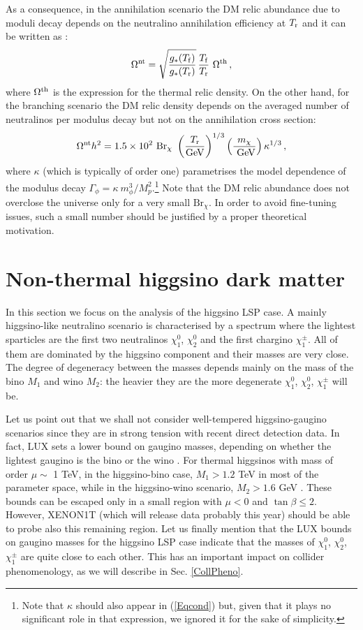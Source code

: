 \documentclass[11pt,a4paper]{article}
\newcommand{\be}{\begin{equation}}
\newcommand{\ee}{\end{equation}}
\begin{document}
As a consequence, in the annihilation scenario the DM relic abundance due to moduli decay depends on the neutralino annihilation efficiency at $T_{\rm r}$ and it can be written as \cite{Gelmini:2006pw}:
\be
\Omega^{\rm nt} =\sqrt{\frac{g_*(T_{\rm f})} {g_*(T_{\rm r})}} \,\frac{T_{\rm f}}{T_{\rm r}} \ \Omega^{\rm th}\,,
\label{NTann}
\ee
where $\Omega^{\rm th}$ is the expression for the thermal relic density. On the other hand, for the branching scenario the DM relic density depends on the averaged number of neutralinos per modulus decay but not on the annihilation cross section:
\be
\Omega^{\rm nt} h^2 =1.5\times 10^2\ \text{Br}_\chi\ \left( \frac{T_{\rm r}}{\text{GeV}}\right)^{1/3} \left( \frac{m_\chi}{\text{ GeV}}\right) \kappa^{1/3}\,,
\label{NTann2}
\ee
where $\kappa$ (which is typically of order one) parametrises the model dependence of the modulus decay $\Gamma_\phi =\kappa\ m_\phi^3/M_p^2$.\footnote{Note that $\kappa$ should also appear in (\ref{Eqcond}) but, given that it plays no significant role in that expression, we ignored it for the sake of simplicity.} Note that the DM relic abundance does not overclose the universe only for a very small $\text{Br}_\chi$. In order to avoid fine-tuning issues, such a small number should be justified by a proper theoretical motivation.



\section{Non-thermal higgsino dark matter}
\label{sec:IndirectDetection}

In this section we focus on the analysis of the higgsino LSP case. A mainly higgsino-like neutralino scenario is characterised by a spectrum where the lightest sparticles are the first two neutralinos $\chi_1^0$, $\chi_2^0$ and the first chargino $\chi_1^\pm$. All of them are dominated by the higgsino component and their masses are very close. The degree of degeneracy between the masses depends mainly on the mass of the bino $M_1$ and wino $M_2$: the heavier they are the more degenerate $\chi_1^0$, $\chi_2^0$, $\chi_1^\pm$ will be. 

Let us point out that we shall not consider well-tempered higgsino-gaugino scenarios since they are in strong tension with recent direct detection data. In fact, LUX sets a lower bound on gaugino masses, depending on whether the lightest gaugino is the bino or the wino \cite{lux}. For thermal higgsinos with mass of order $\mu \sim$ 1 TeV, in the higgsino-bino case, $M_1 > 1.2$ TeV in most of the parameter space, while in the higgsino-wino scenario, $M_2>1.6$ GeV \cite{diCortona:2014yua,Badziak:2015qca}. These bounds can be escaped only in a small region with $\mu<0$ and $\tan\beta\leq 2$. However, XENON1T (which will release data probably this year) should be able to probe also this remaining region. Let us finally mention that the LUX bounds on gaugino masses for the higgsino LSP case indicate that the masses of $\chi_1^0$, $\chi_2^0$, $\chi_1^\pm$ are quite close to each other. This has an important impact on collider phenomenology, as we will describe in Sec. \ref{CollPheno}.
\end{document}
